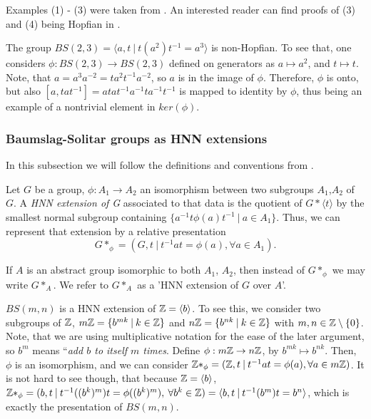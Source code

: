 Examples (1) - (3) were taken from \cite{CeSi23}. An interested reader can find proofs of (3) and (4) being Hopfian in \cite[~chapters I, IV]{LySch15}. 

\begin{importantexample}\cite[page 514]{BrHa11}
    The group $BS(2,3) = \langle a,t \: | \: t(a^2)t^{-1} = a^3\rangle $ is non-Hopfian. To see that, one considers $\phi: BS(2,3) \to BS(2,3)$ defined on generators as $a \mapsto a^2$, and $t \mapsto t$. Note, that $a = a^3a^{-2} = ta^2t^{-1}a^{-2}$, so $a$ is in the image of $\phi$. Therefore, $\phi$ is onto, but also $[a,tat^{-1}] = atat^{-1}a^{-1}ta^{-1}t^{-1}$ is mapped to identity by $\phi$, thus being an example of a nontrivial element in $ker(\phi)$.
\end{importantexample}

\subsubsection{Baumslag-Solitar groups as HNN extensions}

In this subsection we will follow the definitions and conventions from \cite[pages 497-498]{BrHa11}.

\begin{definition}
\label{HNN}
    Let $G$ be a group, $\phi: A_1 \to A_2$ an isomorphism between two subgroups $A_1$,$A_2$ of $G$. A \emph{HNN extension of G} associated to that data is the quotient of $G \ast \langle t \rangle$ by the smallest normal subgroup containing $\{a^{-1}t\phi(a)t^{-1} \: | \: a \in A_1 \}$. Thus, we can represent that extension by a relative presentation 
    \[G \ast_\phi = ( G,t \: | \: t^{-1}at = \phi(a), \forall a \in A_1). \]
\end{definition}

\begin{remark}
    If $A$ is an abstract group isomorphic to both $A_1$, $A_2$, then instead of $G \ast _\phi$ we may write $G \ast _A$. We refer to $G \ast _A$ as a 'HNN extension of $G$ over $A$'.
\end{remark}

\begin{example}\label{BS as HNN}
    $BS(m,n)$ is a HNN extension of $\mathbb{Z}  =\langle b \rangle$. To see this, we consider two subgroups of $\mathbb{Z}$, $m\mathbb{Z} = \{b^{mk}\: | \: k \in \mathbb{Z}\}$ and $n\mathbb{Z} = \{b^{nk}\: | \: k \in \mathbb{Z}\}$ with $m,n \in \mathbb{Z} \setminus \{0\}$. Note, that we are using multiplicative notation for the ease of the later argument, so $b^m$ means ``\emph{add $b$ to itself $m$ times}. Define $\phi: m\mathbb{Z} \to n\mathbb{Z}$, by $b^{mk} \mapsto b^{nk}$. Then, $\phi$ is an isomorphism, and we can consider $\mathbb{Z}\ast_\phi = (\mathbb{Z},t \: | \: t^{-1}at = \phi(a), \forall a\in m\mathbb{Z})$. It is not hard to see though, that because $\mathbb{Z} = \langle b \rangle$, $\mathbb{Z}\ast_\phi = ( b,t \: | \: t^{-1}((b^k)^m)t = \phi((b^k)^m), \: \forall b^k\in \mathbb{Z} ) = \langle b,t \: | \: t^{-1}(b^m)t = b^n\rangle $, which is exactly the presentation of $BS(m,n)$.
\end{example}

